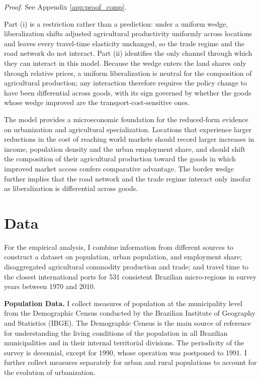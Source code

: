 \documentclass[11pt]{article}
\begin{document}
\noindent\emph{Proof.} See Appendix \ref{app:proof_comp}.\medskip

Part (i) is a restriction rather than a prediction: under a uniform wedge, liberalization shifts adjusted agricultural productivity uniformly across locations and leaves every travel-time elasticity unchanged, so the trade regime and the road network do not interact. Part (ii) identifies the only channel through which they can interact in this model. Because the wedge enters the land shares only through relative prices, a uniform liberalization is neutral for the composition of agricultural production; any interaction therefore requires the policy change to have been differential across goods, with its sign governed by whether the goods whose wedge improved are the transport-cost-sensitive ones.

\vspace{0.3cm}
\noindent The model provides a microeconomic foundation for the reduced-form evidence on urbanization and agricultural specialization. Locations that experience larger reductions in the cost of reaching world markets should record larger increases in income, population density and the urban employment share, and should shift the composition of their agricultural production toward the goods in which improved market access confers comparative advantage. The border wedge further implies that the road network and the trade regime interact only insofar as liberalization is differential across goods.

\section{Data}
For the empirical analysis, I combine information from different sources to construct a dataset on population, urban population, and employment share; disaggregated agricultural commodity production and trade; and travel time to the closest international ports for 531 consistent Brazilian micro-regions in survey years between 1970 and 2010.

\textbf{Population Data.} I collect measures of population at the municipality level from the Demographic Census conducted by the Brazilian Institute of Geography and Statistics (IBGE). The Demographic Census is the main source of reference for understanding the living conditions of the population in all Brazilian municipalities and in their internal territorial divisions. The periodicity of the survey is decennial, except for 1990, whose operation was postponed to 1991. I further collect measures separately for urban and rural populations to account for the evolution of urbanization.
\end{document}
